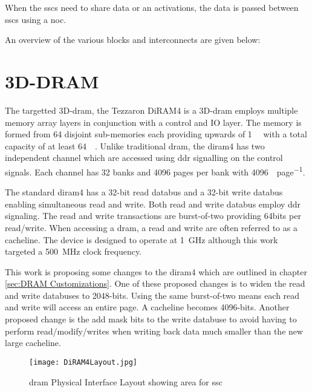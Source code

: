 When the \acp{ssc} need to share data or \ac{an} activations, the data is passed between \acp{ssc} using a \ac{noc}.

An overview of the various blocks and interconnects are given below:

\section{3D-DRAM}
The targetted 3D-\ac{dram}, the Tezzaron DiRAM4 is a 3D-\ac{dram} employs multiple memory array layers in conjunction with a control and IO layer.
The memory is formed from 64 disjoint sub-memories each providing upwards of \SI[per-mode=symbol]{1}{\giga\bit} with a total capacity of at least \SI[per-mode=symbol]{64}{\giga\bit}.
Unlike traditional \ac{dram}, the \ac{diram4} has two independent channel which are accessed using \ac{ddr} signalling on the control signals.
Each channel has 32 banks and 4096 pages per bank with \SI[per-mode=symbol]{4096}{\bit\per page}.

The standard \ac{diram4} has a 32-bit read databus and a 32-bit write databus enabling simultaneous read and write. Both read and write databus employ \ac{ddr} signaling.
The read and write transactions are burst-of-two providing 64bits per read/write. When accessing a \ac{dram}, a read and write are often referred to as a cacheline.
The device is designed to operate at \SI[per-mode=symbol]{1}{\giga\hertz} although this work targeted a \SI[per-mode=symbol]{500}{\mega\hertz} clock frequency.

This work is proposing some changes to the \ac{diram4} which are outlined in chapter \ref{sec:DRAM Customizations}. One of these proposed changes is to widen the read and write databuses to 2048-bits.
Using the same burst-of-two means each read and write will access an entire page. A cacheline becomes 4096-bits.
Another proposed change is the add mask bits to the write databuse to avoid having to perform read/modify/writes when writing back data much smaller than the new large cacheline.

\begin{figure}[!t]
\centering
\captionsetup{justification=centering}
\captionsetup{width=.9\linewidth}
\centerline{
\mbox{\texttt{[image: DiRAM4Layout.jpg]}}
}
\caption{\ac{dram} Physical Interface Layout showing area for \ac{ssc}}
\label{fig:diram4Layout}
\end{figure}


